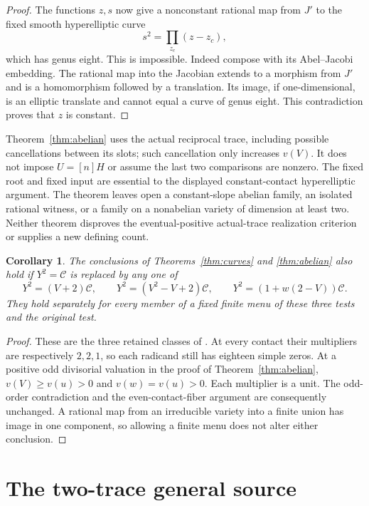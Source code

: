 \documentclass[11pt,a4paper]{article}
\newtheorem{corollary}[theorem]{Corollary}
\begin{document}
\begin{proof}
The functions $z,s$ now give a nonconstant rational map from $J'$
to the fixed smooth hyperelliptic curve
\[
                          s^2=\prod_{z_c}(z-z_c),
\]
which has genus eight. This is impossible. Indeed compose with
its Abel--Jacobi embedding. The rational map into the Jacobian
extends to a morphism from $J'$ and is a homomorphism followed
by a translation. Its image, if one-dimensional, is an elliptic
translate and cannot equal a curve of genus eight. This contradiction
proves that $z$ is constant.
\end{proof}

Theorem~\ref{thm:abelian} uses the actual reciprocal trace, including
possible cancellations between its slots; such cancellation only
increases $v(V)$. It does not impose $U=[n]H$ or assume the last
two comparisons are nonzero. The fixed root and fixed input are
essential to the displayed constant-contact hyperelliptic argument.
The theorem leaves open a constant-slope abelian family, an isolated
rational witness, or a family on a nonabelian variety of dimension
at least two. Neither theorem disproves the eventual-positive
actual-trace realization criterion or supplies a new defining count.

\begin{corollary}\label{cor:classes}
The conclusions of Theorems~\ref{thm:curves} and \ref{thm:abelian}
also hold if $Y^2=\mathcal C$ is replaced by any one of
\[
 Y^2=(V+2)\mathcal C,\qquad
 Y^2=(V^2-V+2)\mathcal C,\qquad
 Y^2=(1+w(2-V))\mathcal C.
\]
They hold separately for every member of a fixed finite menu of
these three tests and the original test.
\end{corollary}
\begin{proof}
These are the three retained classes of \cite{Classes}. At every
contact their multipliers are respectively $2,2,1$, so each
radicand still has eighteen simple zeros. At a positive odd
divisorial valuation in the proof of Theorem~\ref{thm:abelian},
$v(V)\ge v(u)>0$ and $v(w)=v(u)>0$. Each multiplier is a
unit. The odd-order contradiction and the even-contact-fiber
argument are consequently unchanged. A rational map from an
irreducible variety into a finite union has image in one component,
so allowing a finite menu does not alter either conclusion.
\end{proof}

\section{The two-trace general source}
\end{document}
